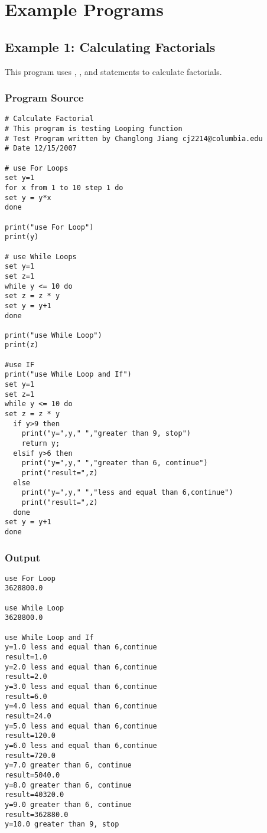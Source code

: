 \chapter{Example Programs}

\section{Example 1: Calculating Factorials}

This program uses , , and  statements to
calculate factorials.

\subsection{Program Source}

\begin{verbatim}
# Calculate Factorial
# This program is testing Looping function
# Test Program written by Changlong Jiang cj2214@columbia.edu
# Date 12/15/2007 

# use For Loops
set y=1
for x from 1 to 10 step 1 do
set y = y*x
done

print("use For Loop")
print(y)  

# use While Loops
set y=1
set z=1
while y <= 10 do
set z = z * y
set y = y+1
done

print("use While Loop")
print(z) 

#use IF
print("use While Loop and If")
set y=1
set z=1
while y <= 10 do
set z = z * y
  if y>9 then
    print("y=",y," ","greater than 9, stop")
    return y;
  elsif y>6 then
    print("y=",y," ","greater than 6, continue")
    print("result=",z)
  else
    print("y=",y," ","less and equal than 6,continue")
    print("result=",z)
  done
set y = y+1
done 
\end{verbatim}



\subsection{Output}

\begin{verbatim}
use For Loop
3628800.0

use While Loop
3628800.0

use While Loop and If
y=1.0 less and equal than 6,continue
result=1.0
y=2.0 less and equal than 6,continue
result=2.0
y=3.0 less and equal than 6,continue
result=6.0
y=4.0 less and equal than 6,continue
result=24.0
y=5.0 less and equal than 6,continue
result=120.0
y=6.0 less and equal than 6,continue
result=720.0
y=7.0 greater than 6, continue
result=5040.0
y=8.0 greater than 6, continue
result=40320.0
y=9.0 greater than 6, continue
result=362880.0
y=10.0 greater than 9, stop 
\end{verbatim}





